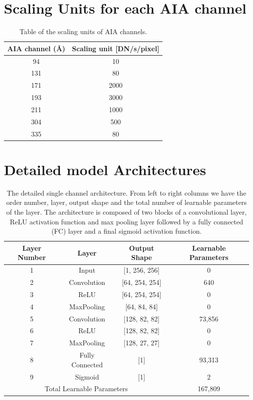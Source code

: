 \documentclass{aa}
\begin{document}
\newpage
\begin{appendix}
\section{Scaling Units for each AIA channel}
\label{section:appendix_average}

\begin{table}[h!]
  \centering
  \caption{Table of the scaling units of  AIA channels.}
  \label{tab:average_channels}
  \begin{tabular}{cc}
    \toprule
     AIA channel (\AA) &  Scaling unit [DN/s/pixel] \\
     \midrule
       94 &   10  \\
      131 &   80  \\
      171 & 2000  \\
      193 & 3000  \\
      211 & 1000  \\
      304 &  500  \\
      335 &   80  \\
      \bottomrule
  \end{tabular}
\end{table}

\section{Detailed model Architectures}
\label{section:appendix_archtectures}

\begin{table}[h!]
  \centering
  \caption{The detailed single channel architecture. From left to right columns we have the order number, layer, output shape and the total number of learnable parameters of the layer. The architecture is composed of two blocks of a convolutional layer, ReLU activation function  and max pooling layer followed by a fully connected (FC) layer and a final sigmoid activation function.}
  \label{tab:single-channel-arch}
  \begin{tabular}{|c|c|c|c|}
    \hline
    Layer Number & Layer &  Output Shape & Learnable Parameters \\
     \hline
1&           Input    &  [1, 256, 256]    &         0 \\
2&     Convolution    & [64, 254, 254]    &       640 \\
3&            ReLU    & [64, 254, 254]    &         0 \\
4&      MaxPooling    &   [64, 84, 84]    &         0 \\
5&     Convolution    &  [128, 82, 82]    &    73,856 \\
6&            ReLU    &  [128, 82, 82]    &         0 \\
7&      MaxPooling    &  [128, 27, 27]    &         0 \\
8& Fully Connected    &            [1]    &    93,313 \\
9&         Sigmoid    &            [1]    &         2 \\
            \hline
\multicolumn{3}{|c|}{Total Learnable Parameters} &   167,809 \\


\end{tabular}
\end{table}
\end{appendix}
\end{document}
